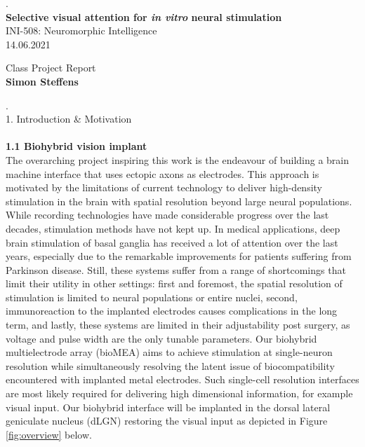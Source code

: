 \documentclass[8pt]{beamer}
\begin{document}
\justify
\linespread{0.8}

\thispagestyle{empty}
\begin{center}
    \vspace{1cm}
    \tiny.\\
		\LARGE \textbf{Selective visual attention for \textit{in vitro} neural stimulation} \\
			
		\vspace{1.8cm}
		\large
		INI-508: Neuromorphic Intelligence \\
		\vspace{0.1cm}
		14.06.2021
			
		\vspace{0.7cm}
		Class Project Report \\
		\textbf{Simon Steffens}
    \pagebreak
	\end{center}


  \tiny .\\
	\large{1. Introduction \& Motivation} \\~\\
	
  {\selectfont
  \small{ \textbf{ 1.1 Biohybrid vision implant} \\
  The overarching project inspiring this work is the endeavour of building a
	brain machine interface that uses ectopic axons as electrodes. This approach
	is motivated by the limitations of current technology to deliver high-density
	stimulation in the brain with spatial resolution beyond large neural
	populations. While recording technologies have made considerable progress over
	the last decades, stimulation methods have not kept up. In medical
	applications, deep brain stimulation of basal ganglia has received a lot of
	attention over the last years, especially due to the remarkable improvements
	for patients suffering from Parkinson disease. Still, these systems suffer
	from a range of shortcomings that limit their utility in other settings: first
	and foremost, the spatial resolution of stimulation is limited to neural
	populations or entire nuclei, second, immunoreaction to the implanted
	electrodes causes complications in the long term, and lastly, these systems
	are limited in their adjustability post surgery, as voltage and pulse width
	are the only tunable parameters. Our biohybrid multielectrode array (bioMEA)
	aims to achieve stimulation at single-neuron resolution while simultaneously
	resolving the latent issue of biocompatibility encountered with implanted
	metal electrodes. Such single-cell resolution interfaces are most likely
	required for delivering high dimensional information, for example visual
	input. Our biohybrid interface will be implanted in the dorsal lateral
	geniculate nucleus (dLGN) restoring the visual input as depicted in Figure
	\ref{fig:overview} below.}}













  
\begin{frame}
  \center
\end{frame}
\end{document}
